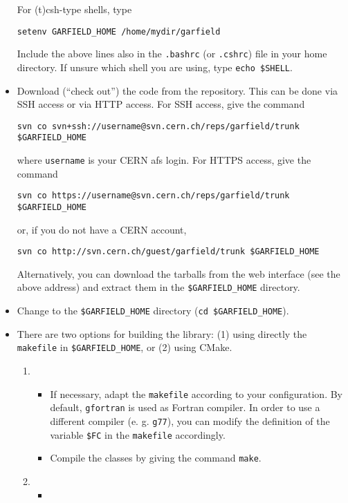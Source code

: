 \begin{itemize}
  For (t)csh-type shells, type
  \begin{lstlisting}
setenv GARFIELD_HOME /home/mydir/garfield
  \end{lstlisting}
  Include the above lines also in the \texttt{.bashrc} 
  (or \texttt{.cshrc}) file in your home directory. 
  If unsure which shell you are using, 
  type \texttt{echo \${SHELL}}.
  \item
  Download (``check out'') the code from the repository.
  This can be done via SSH access or via HTTP access.
  For SSH access, give the command
  \begin{lstlisting}
svn co svn+ssh://username@svn.cern.ch/reps/garfield/trunk $GARFIELD_HOME
  \end{lstlisting}
  where \texttt{username} is your CERN afs login.  
  For HTTPS access, give the command
  \begin{lstlisting}
svn co https://username@svn.cern.ch/reps/garfield/trunk $GARFIELD_HOME
  \end{lstlisting}
  or, if you do not have a CERN account,
  \begin{lstlisting}
svn co http://svn.cern.ch/guest/garfield/trunk $GARFIELD_HOME 
  \end{lstlisting}
  Alternatively, 
  you can download the tarballs from the web interface 
  (see the above address) and extract them in the 
  \texttt{\$GARFIELD\_HOME} directory.
  \item
  Change to the \texttt{\${GARFIELD\_HOME}} directory 
  (\texttt{cd \$GARFIELD\_HOME}).
  \item
  There are two options for building the library: (1) using directly the 
  \texttt{makefile} in \texttt{\${GARFIELD\_HOME}}, or (2) using CMake.
  \begin{enumerate}
  \item
  \begin{itemize}
  \item 
  If necessary, adapt the \texttt{makefile} according 
  to your configuration. 
  By default, \texttt{gfortran} is used as Fortran compiler. 
  In order to use a different compiler (e. g. \texttt{g77}), 
  you can modify the definition of the variable \texttt{\$FC} in the 
  \texttt{makefile} accordingly.
  \item
  Compile the classes by giving the command \texttt{make}.
  \end{itemize}
  \item
  \begin{itemize}
  \item

\end{itemize}
\end{enumerate}
\end{itemize}
